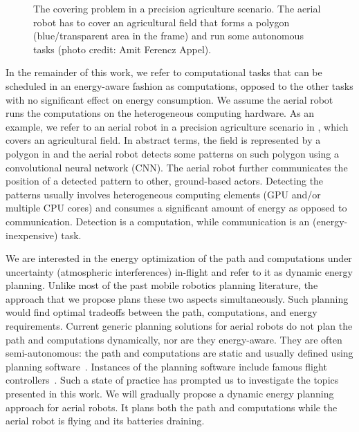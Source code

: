 \begin{figure}[t!]
  \centering
  
  \caption[The covering problem in a precision agriculture scenario]{The covering problem in a precision agriculture scenario. The aerial robot has to cover an agricultural field that forms a polygon (blue/transparent area in the frame) and run some autonomous tasks {\scriptsize(photo credit: Amit Ferencz Appel)}.}
  \label{fig:plot2}
\end{figure}

In the remainder of this work, we refer to computational tasks that can be scheduled in an energy-aware fashion as computations, opposed to the other tasks with no significant effect on energy consumption. We assume the aerial robot runs the computations on the heterogeneous computing hardware. As an example, we refer to an aerial robot in a precision agriculture scenario in , which covers an agricultural field. In abstract terms, the field is represented by a polygon in  and the aerial robot detects some patterns on such polygon using a convolutional neural network (CNN). The aerial robot further communicates the position of a detected pattern to other, ground-based actors. Detecting the patterns usually involves heterogeneous computing elements (GPU and/or multiple CPU cores) and consumes a significant amount of energy as opposed to communication. Detection is a computation, while communication is an (energy-inexpensive) task.

We are interested in the energy optimization of the path and computations under uncertainty (atmospheric interferences) in-flight and refer to it as dynamic energy planning. Unlike most of the past mobile robotics planning literature, the approach that we propose plans these two aspects simultaneously. Such planning would find optimal tradeoffs between the path, computations, and energy requirements. Current generic planning solutions for aerial robots do not plan the path and computations dynamically, nor are they energy-aware. They are often semi-autonomous: the path and computations are static and usually defined using planning software~\citep{daponte2019review}. Instances of the planning software include famous flight controllers~\citep{px4,papa}. Such a state of practice has prompted us to investigate the topics presented in this work. We will gradually propose a dynamic energy planning approach for aerial robots. It plans both the path and computations while the aerial robot is flying and its batteries draining. 

